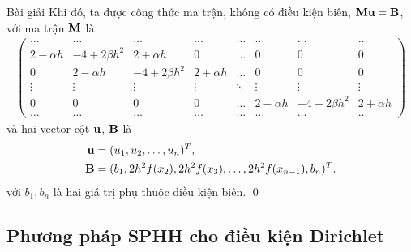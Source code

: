 \documentclass[9pt]{beamer}
\numberwithin{equation}{section}
\begin{document}
\begin{frame}
\begin{exampleblock}{Bài giải}
    Khi đó, ta được công thức ma trận, không có điều kiện biên, ${\bf M} {\bf u} = {\bf B}$, với ma trận ${\bf M}$ là
    \begin{align*}
        \begin{pmatrix}
            \dots & \dots & \dots & \dots & \dots & \dots & \dots & \dots \\
            2 - \alpha h & -4 + 2\beta h^2 & 2 + \alpha h & 0 & \dots & 0 & 0 & 0 \\
            0 & 2 - \alpha h & -4 + 2\beta h^2 & 2 + \alpha h & \dots & 0 & 0 & 0 \\
            \vdots & \vdots & \vdots & \vdots & \ddots & \vdots & \vdots & \vdots \\
            0 & 0 & 0 & 0 & \dots & 2 - \alpha h & -4 + 2\beta h^2 & 2 + \alpha h \\
            \dots & \dots & \dots & \dots & \dots & \dots & \dots & \dots
        \end{pmatrix}
    \end{align*}
    và hai vector cột ${\bf u}$, ${\bf B}$ là
    \begin{align*}
        {\bf u} &= (u_1, u_2, \ldots, u_n)^T, \\
        {\bf B} &= (b_1, 2h^2 f(x_2), 2h^2 f(x_3), \dots, 2h^2 f(x_{n-1}), b_n)^T.
    \end{align*}
    với $b_1, b_n$ là hai giá trị phụ thuộc điều kiện biên. \fhill \qed
\end{exampleblock}
\end{frame}

\subsection{Phương pháp SPHH cho điều kiện Dirichlet}
\end{document}

